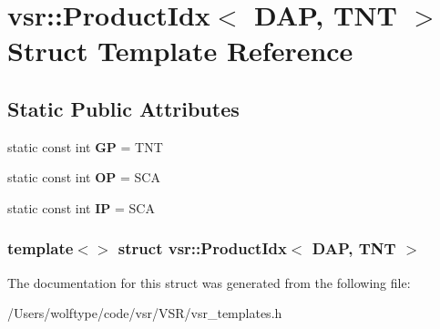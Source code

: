 \hypertarget{structvsr_1_1_product_idx_3_01_d_a_p_00_01_t_n_t_01_4}{\section{vsr\-:\-:Product\-Idx$<$ D\-A\-P, T\-N\-T $>$ Struct Template Reference}
\label{structvsr_1_1_product_idx_3_01_d_a_p_00_01_t_n_t_01_4}
}
\subsection*{Static Public Attributes}
\begin{DoxyCompactItemize}
\item 
\hypertarget{structvsr_1_1_product_idx_3_01_d_a_p_00_01_t_n_t_01_4_a28274f7aaac7a97f124dd1e7773a95b8}{static const int {\bfseries G\-P} = T\-N\-T}\label{structvsr_1_1_product_idx_3_01_d_a_p_00_01_t_n_t_01_4_a28274f7aaac7a97f124dd1e7773a95b8}

\item 
\hypertarget{structvsr_1_1_product_idx_3_01_d_a_p_00_01_t_n_t_01_4_a1c96c0dce1d7d94e9d35b470a5e281d3}{static const int {\bfseries O\-P} = S\-C\-A}\label{structvsr_1_1_product_idx_3_01_d_a_p_00_01_t_n_t_01_4_a1c96c0dce1d7d94e9d35b470a5e281d3}

\item 
\hypertarget{structvsr_1_1_product_idx_3_01_d_a_p_00_01_t_n_t_01_4_aeeb93116ca6e54eda1fa529e032b8702}{static const int {\bfseries I\-P} = S\-C\-A}\label{structvsr_1_1_product_idx_3_01_d_a_p_00_01_t_n_t_01_4_aeeb93116ca6e54eda1fa529e032b8702}

\end{DoxyCompactItemize}
\subsubsection*{template$<$$>$ struct vsr\-::\-Product\-Idx$<$ D\-A\-P, T\-N\-T $>$}



The documentation for this struct was generated from the following file\-:\begin{DoxyCompactItemize}
\item 
/\-Users/wolftype/code/vsr/\-V\-S\-R/vsr\-\_\-templates.\-h\end{DoxyCompactItemize}
